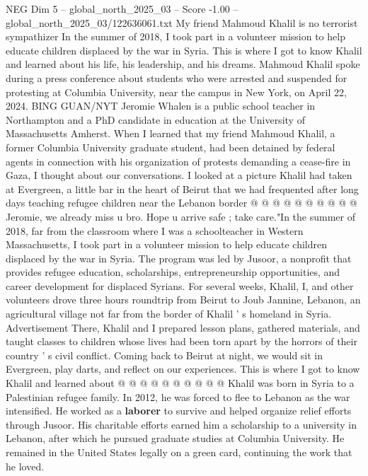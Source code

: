 \begin{textsample}{NEG Dim 5 – global\_north\_2025\_03 – Score -1.00 – global\_north\_2025\_03/122636061.txt}  \label{ex:f5_neg_253}
My friend Mahmoud Khalil is no terrorist sympathizer In the summer of 2018, I took part in a volunteer mission to help educate children displaced by the war in Syria.
This is where I got to know Khalil and learned about his life, his leadership, and his dreams.
Mahmoud Khalil spoke during a press conference about students who were arrested and suspended for protesting at Columbia University, near the campus in New York, on April 22, 2024.
BING GUAN/NYT Jeromie Whalen is a public school teacher in Northampton and a PhD candidate in education at the University of Massachusetts Amherst.
When I learned that my friend Mahmoud Khalil, a former Columbia University graduate student, had been detained by federal agents in connection with his organization of protests demanding a cease-fire in Gaza, I thought about our conversations.
I looked at a picture Khalil had taken at Evergreen, a little bar in the heart of Beirut that we had frequented after long days teaching refugee children near the Lebanon border @ @ @ @ @ @ @ @ @ @ Jeromie, we already miss u bro.
Hope u arrive safe ; take care."In the summer of 2018, far from the classroom where I was a schoolteacher in Western Massachusetts, I took part in a volunteer mission to help educate children displaced by the war in Syria.
The program was led by Jusoor, a nonprofit that provides refugee education, scholarships, entrepreneurship opportunities, and career development for displaced Syrians.
For several weeks, Khalil, I, and other volunteers drove three hours roundtrip from Beirut to Joub Jannine, Lebanon, an agricultural village not far from the border of Khalil ' s homeland in Syria.
Advertisement There, Khalil and I prepared lesson plans, gathered materials, and taught classes to children whose lives had been torn apart by the horrors of their country ' s civil conflict.
Coming back to Beirut at night, we would sit in Evergreen, play darts, and reflect on our experiences.
This is where I got to know Khalil and learned about @ @ @ @ @ @ @ @ @ @ Khalil was born in Syria to a Palestinian refugee family.
In 2012, he was forced to flee to Lebanon as the war intensified.
He worked as a \textbf{laborer} to survive and helped organize relief efforts through Jusoor.
His charitable efforts earned him a scholarship to a university in Lebanon, after which he pursued graduate studies at Columbia University.
He remained in the United States legally on a green card, continuing the work that he loved.

\end{textsample}
